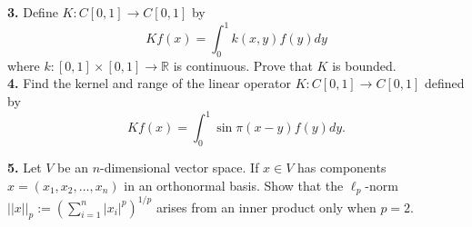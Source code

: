 \documentclass[aps,prl,groupedaddress,amsmath,amssymb,nofootinbib,12pt]{revtex4-1}
\begin{document}
\textbf{3.} Define $K : C[0,1] \to C[0,1]$ by
\[K f(x) = \int_0^1 k(x,y)f(y) dy\]
where $k:[0,1] \times [0,1] \to \mathbb{R}$ is continuous. Prove that $K$ is bounded.\\

\textbf{4.} Find the kernel and range of the linear operator $K : C[0,1] \to C[0,1]$ defined by
\[Kf(x) = \int_0^1 \sin \pi(x-y)f(y)dy.\]

\textbf{5.} Let $V$ be an $n$-dimensional vector space. If $x \in V$ has components $x = (x_1, x_2, . . . , x_n)$ in an orthonormal basis. Show that the $\ell_p$-norm $||x||_p:= \left(\sum_{i=1}^n |x_i|^p\right)^{1/p}$
arises from an inner product only when $p = 2$.
\end{document}
